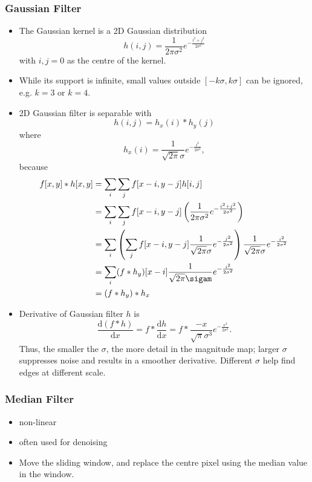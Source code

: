 \documentclass[twocolumn,landscape,10pt]{article}
\theoremstyle{definition}
\begin{document}
\subsubsection{Gaussian Filter}

\begin{itemize}
    \item The Gaussian kernel is a 2D Gaussian distribution
        \[
            h(i,j)=\frac{1}{2\pi\sigma^2}e^{-\frac{i^2+j^2}{2\sigma^2}}
        \]
        with $i,j=0$ as the centre of the kernel.
    \item While its support is infinite, small values outside
        $[-k\sigma,k\sigma]$ can be ignored, e.g. $k=3$ or $k=4$.
    \item 2D Gaussian filter is separable with
        \[
            h(i,j)=h_x(i) * h_y(j)
        \]
        where
        \[
            h_x(i)=\frac{1}{\sqrt{2\pi}\sigma}e^{-\frac{i^2}{2\sigma^2}},
        \]
        because
        \begin{align*}
            f[x,y]*h[x,y]
            & = \sum_i\sum_j f[x-i,y-j]h[i,j] \\
            & = \sum_i\sum_j
            f[x-i,y-j]\left(\frac{1}{2\pi\sigma^2}e^{-\frac{i^2+j^2}{2\sigma^2}}\right) \\
            & = \sum_i\left(\sum_j
            f[x-i,y-j]\frac{1}{\sqrt{2\pi}\sigma}e^{-\frac{j^2}{2\sigma^2}}\right)
            \frac{1}{\sqrt{2\pi}\sigma}e^{-\frac{i^2}{2\sigma^2}} \\
            & =
            \sum_i(f*h_y)[x-i]\frac{1}{\sqrt{2\pi}\sigam}e^{-\frac{i^2}{2\sigma^2}} \\
            & = (f*h_y)*h_x
        \end{align*} 
    \item Derivative of Gaussian filter $h$ is
        \[
            \frac{\mathrm{d}(f*h)}{\mathrm{d}x}=f*\frac{\mathrm{d}h}{\mathrm{d}x}
            =f*\frac{-x}{\sqrt{\pi}\sigma^3}e^{-\frac{x^2}{2\sigma^2}}.
        \]
        Thus, the smaller the $\sigma$, the more detail in the magnitude map;
        larger $\sigma$ suppresses noise and results in a smoother derivative.
        Different $\sigma$ help find edges at different scale.
\end{itemize} 

\subsubsection{Median Filter}

\begin{itemize}
    \item non-linear
    \item often used for denoising
    \item Move the sliding window, and replace the centre pixel using the median
        value in the window.
\end{itemize} 
\end{document}
